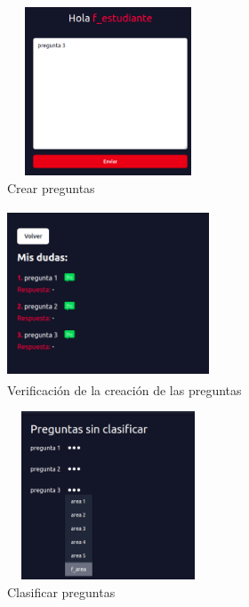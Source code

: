 \begin{figure}[h]
	\begin{center}
		\includegraphics[width=6cm, height=5cm]{crear_pregunta.png}
		\caption{Crear preguntas}
		\label{fig:f_crear_pregunta}
		
	\end{center}
\end{figure}

\begin{figure}[h]
	\begin{center}
		\includegraphics[width=6cm, height=5cm]{verificar_crear_preguntas.png}
		\caption{Verificación de la creación de las preguntas}
		\label{fig:f_verificar_crear_preguntas}
		
	\end{center}
\end{figure}

\begin{figure}[h]
	\begin{center}
		\includegraphics[width=6cm, height=5cm]{clasificar_preguntas.png}
		\caption{Clasificar preguntas}
		\label{fig:f_clasificar_preguntas}
		
	\end{center}
\end{figure}

